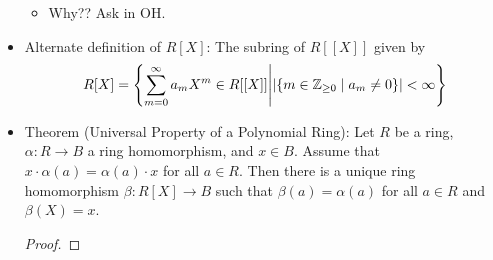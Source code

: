 \documentclass[../notes.tex]{subfiles}
\begin{document}
\begin{itemize}
    \begin{itemize}
        \item Why?? Ask in OH.
    \end{itemize}
    \item Alternate definition of $R[X]$: The subring of $R[[X]]$ given by
    \begin{equation*}
        R[X] = \left\{ \sum_{m=0}^\infty a_mX^m\in R[[X]] \middle| |\{m\in{\mathbb{Z}_{\geq 0}}\mid a_m\neq 0\}|<\infty \right\}
    \end{equation*}
    \item Theorem (Universal Property of a Polynomial Ring): Let $R$ be a ring, $\alpha:R\to B$ a ring homomorphism, and $x\in B$. Assume that $x\cdot\alpha(a)=\alpha(a)\cdot x$ for all $a\in R$. Then there is a unique ring homomorphism $\beta:R[X]\to B$ such that $\beta(a)=\alpha(a)$ for all $a\in R$ and $\beta(X)=x$.
    \begin{proof}


\end{proof}
\end{itemize}
\end{document}
